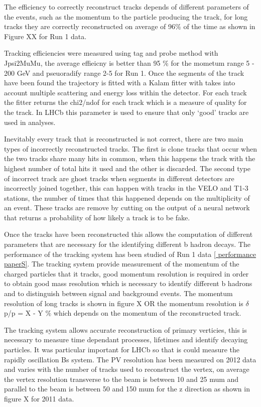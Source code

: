 The efficiency to correctly reconstruct tracks depends of different parameters of the events, such as the momentum to the particle producing the track, for long tracks they are correctly reconstructed on average of 96$\%$ of the time as shown in Figure XX for Run 1 data. 

Tracking efficiencies were measured using tag and probe method with Jpsi2MuMu, the average effieicny is better than 95 $\%$ for the mometum range 5 - 200 GeV and pseuoradify range 2-5 for Run 1. %
Once the segments of the track have been found the trajectory is fitted with a Kalam fitter with takes into account multiple scattering and energy loss within the detector. For each track the fitter returns the chi2/ndof for each track which is a measure of quality for the track. In LHCb this parameter is used to ensure that only ‘good’ tracks are used in analyses. 

Inevitably every track that is reconstructed is not correct, there are two main types of incorrectly reconstructed tracks. The first is clone tracks that occur when the two tracks share many hits in common, when this happens the track with the highest number of total hits it used and the other is discarded. The second type of incorrect track are ghost tracks when segments in different detectors are incorrectly joined together, this can happen with tracks in the VELO and T1-3 stations, the number of times that this happened depends on the multiplicity of an event. These tracks are remove by cutting on the output of a neural network that returns a probability of how likely a track is to be fake.



Once the tracks have been reconstructed this allows the computation of different parameters that are necessary for the identifying different b hadron decays. The performance of the tracking system has been studied of Run 1 data \ref{ performance paperS}. The tracking system provide measurement of the momentum of the charged particles that it tracks, good momentum resolution is required in order to obtain good mass resolution which is necessary to identify different  b hadrons and to distinguish between signal and background events. The momentum resolution of long tracks is shown in figure X OR the momentum resolution is $\delta$p/p = X - Y $\%$ which depends on the momentum of the reconstructed track. 


The tracking system allows accurate reconstruction of primary verticies, this is necessary to measure time dependant processes, lifetimes and identify decaying particles. It was particular important for LHCb so that is could measure the rapidly oscillation Bs system. The PV resolution has been measured on 2012 data and varies with the number of tracks used to reconstruct the vertex, on average the vertex resolution transverse to the beam is between 10 and 25 mum and parallel to the beam is  between 50 and 150 mum for the z direction as shown in figure X for 2011 data. %



